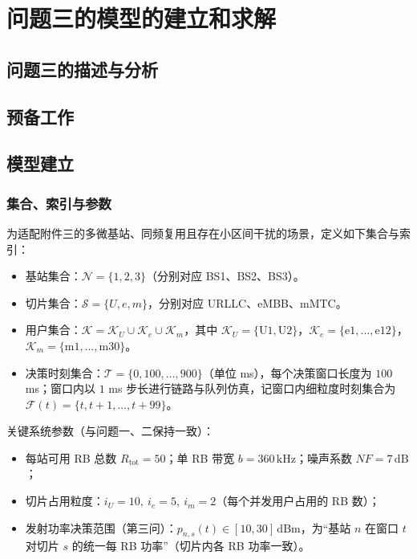 \section{问题三的模型的建立和求解}
\subsection{问题三的描述与分析}

\subsection{预备工作}

\subsection{模型建立}

\subsubsection{集合、索引与参数}

为适配附件三的多微基站、同频复用且存在小区间干扰的场景，定义如下集合与索引：

\begin{itemize}
  \item 基站集合：$\mathcal{N}=\{1,2,3\}$（分别对应 BS1、BS2、BS3）。
  \item 切片集合：$\mathcal{S}=\{U,e,m\}$，分别对应 URLLC、eMBB、mMTC。
  \item 用户集合：$\mathcal{K}=\mathcal{K}_U\cup\mathcal{K}_e\cup\mathcal{K}_m$，其中 $\mathcal{K}_U=\{\mathrm{U1},\mathrm{U2}\}$，$\mathcal{K}_e=\{\mathrm{e1},\dots,\mathrm{e12}\}$，$\mathcal{K}_m=\{\mathrm{m1},\dots,\mathrm{m30}\}$。
  \item 决策时刻集合：$\mathcal{T}=\{0,100,\dots,900\}$（单位 ms），每个决策窗口长度为 $100$ ms；窗口内以 $1$ ms 步长进行链路与队列仿真，记窗口内细粒度时刻集合为 $\mathcal{F}(t)=\{t,t+1,\dots,t+99\}$。
\end{itemize}

关键系统参数（与问题一、二保持一致）：

\begin{itemize}
  \item 每站可用 RB 总数 $R_{\text{tot}}=50$；单 RB 带宽 $b=360\,\mathrm{kHz}$；噪声系数 $NF=7\,\mathrm{dB}$；
  \item 切片占用粒度：$i_U=10,\ i_e=5,\ i_m=2$（每个并发用户占用的 RB 数）；
  \item 发射功率决策范围（第三问）：$p_{n,s}(t)\in[10,30]\,\mathrm{dBm}$，为“基站 $n$ 在窗口 $t$ 对切片 $s$ 的统一每 RB 功率”（切片内各 RB 功率一致）。
\end{itemize}

